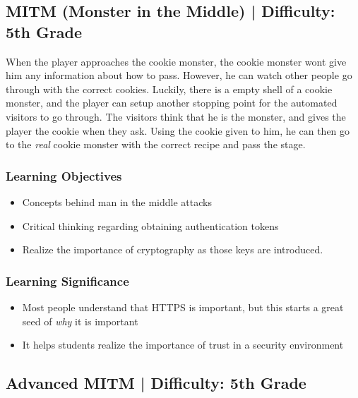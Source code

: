 \documentclass{article}
\begin{document}
\subsection{MITM (Monster in the Middle) | Difficulty: 5th Grade}

When the player approaches the cookie monster, the cookie monster wont
give him any information about how to pass. However, he can watch
other people go through with the correct cookies. Luckily, there is a
empty shell of a cookie monster, and the player can setup another
stopping point for the automated visitors to go through. The visitors
think that he is the monster, and gives the player the cookie when
they ask. Using the cookie given to him, he can then go to the
\textit{real} cookie monster with the correct recipe and pass the
stage.

\subsubsection{Learning Objectives}

\begin{itemize}
  \item Concepts behind man in the middle attacks
  \item Critical thinking regarding obtaining authentication tokens
  \item Realize the importance of cryptography as those keys are
    introduced.
\end{itemize}

\subsubsection{Learning Significance}

\begin{itemize}
  \item Most people understand that HTTPS is important, but this
    starts a great seed of \textit{why} it is important
  \item It helps students realize the importance of trust in a
    security environment
\end{itemize}

\pagebreak

\subsection{Advanced MITM | Difficulty: 5th Grade}
\end{document}

